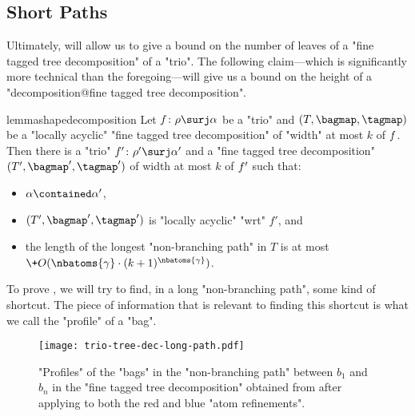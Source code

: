 \subsection{{\AP}Short Paths}

Ultimately,  will allow us to give a bound on the number of
leaves of a "fine tagged tree decomposition" of a "trio". The following claim---which is 
significantly more technical than the foregoing---will give us a bound on the height of
a "decomposition@fine tagged tree decomposition".

\begin{restatable}{lemma}{shapedecomposition}
    \AP\label{lemma:shape-decomposition}
    Let $\fun\colon \rho \surj \alpha$ be a "trio" and $(T, \bagmap, \tagmap)$ be a "locally acyclic"
    "fine tagged tree decomposition" of "width" at most $k$ of $f$.
    Then there is a "trio" $\fun'\colon \rho' \surj \alpha'$ and a "fine tagged tree decomposition" $(T', \bagmap', \tagmap')$ of width at most $k$ of $f'$ such that:
    \begin{itemize}
        \item $\alpha \contained \alpha'$,
        \item $(T',\bagmap', \tagmap')$ is "locally acyclic" "wrt" $f'$, and
        \item the length of the longest "non-branching path" in $T$ is at most
        $\+O(\nbatoms{\gamma}\cdot (k+1)^{\nbatoms{\gamma}})$.
    \end{itemize}
\end{restatable}

\smallskip

To prove , we will try to find, in a long "non-branching path",
some kind of shortcut. The piece of information that is relevant to finding this shortcut
is what we call the "profile" of a "bag".

\begin{figure*}[tbp]
	\centering
	\texttt{[image: trio-tree-dec-long-path.pdf]}
	\caption{
		\AP\label{fig:trio-tree-dec-long-path}
        "Profiles" of the "bags" in the "non-branching path" between $b_1$ and $b_n$ in the "fine tagged tree decomposition" obtained from  after applying 
		 to both the
		red and blue "atom refinements".
	}
\end{figure*}


